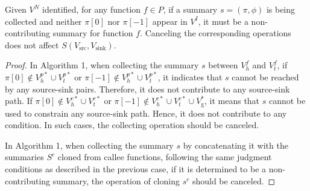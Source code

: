 \appendix

\begin{theorem}[Soundness]
\label{thm:sound}

Given $V^{N}$ identified, for any function $f \in P$, if a summary $s=(\pi, \phi)$ is being collected and neither $\pi[0]$ nor $\pi[-1]$ appear in $V^{I}$, it must be a non-contributing summary for function $f$. Canceling the corresponding operations does not affect $S(V_{\text{src}}, V_{\text{sink}})$.
\begin{proof}

In Algorithm 1, when collecting the summary $s$ between $V_{h}^{f}$ and $V_{t}^{f}$, if $\pi[0] \notin V_h^{p*} \cup V_t^{p*}$ or $\pi[-1] \notin V_h^{p*} \cup V_t^{p*}$, it indicates that $s$ cannot be reached by any source-sink pairs. Therefore, it does not contribute to any source-sink path. If $\pi[0] \notin V_h^{c*} \cup V_t^{c*}$ or $\pi[-1] \notin V_h^{c*} \cup V_t^{c*} \cup V_{\text{g}}^{*}$, it means that $s$ cannot be used to constrain any source-sink path. Hence, it does not contribute to any condition. In such cases, the collecting operation should be canceled.

In Algorithm 1, when collecting the summary $s$ by concatenating it with the summaries $S^{c}$ cloned from callee functions, following the same judgment conditions as described in the previous case, if it is determined to be a non-contributing summary, the operation of cloning $s^{c}$ should be canceled.
\end{proof}
\end{theorem}

